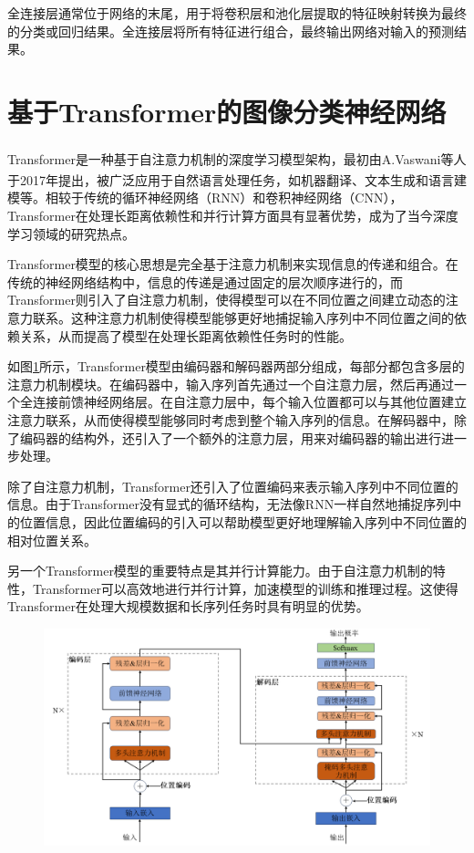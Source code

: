全连接层通常位于网络的末尾，用于将卷积层和池化层提取的特征映射转换为最终的分类或回归结果。全连接层将所有特征进行组合，最终输出网络对输入的预测结果。


\section{基于Transformer的图像分类神经网络}
Transformer\textsuperscript{\cite{bengio2013representation}}是一种基于自注意力机制的深度学习模型架构，最初由A.Vaswani等人于2017年提出\textsuperscript{\cite{vaswani2017attenion}}，被广泛应用于自然语言处理任务，如机器翻译、文本生成和语言建模等。相较于传统的循环神经网络（RNN）和卷积神经网络（CNN），Transformer在处理长距离依赖性和并行计算方面具有显著优势，成为了当今深度学习领域的研究热点。

Transformer模型的核心思想是完全基于注意力机制来实现信息的传递和组合。在传统的神经网络结构中，信息的传递是通过固定的层次顺序进行的，而Transformer则引入了自注意力机制，使得模型可以在不同位置之间建立动态的注意力联系。这种注意力机制使得模型能够更好地捕捉输入序列中不同位置之间的依赖关系，从而提高了模型在处理长距离依赖性任务时的性能。

如图\ref{fig:vit1}所示，Transformer模型由编码器和解码器两部分组成，每部分都包含多层的注意力机制模块。在编码器中，输入序列首先通过一个自注意力层，然后再通过一个全连接前馈神经网络层。在自注意力层中，每个输入位置都可以与其他位置建立注意力联系，从而使得模型能够同时考虑到整个输入序列的信息。在解码器中，除了编码器的结构外，还引入了一个额外的注意力层，用来对编码器的输出进行进一步处理。

除了自注意力机制，Transformer还引入了位置编码来表示输入序列中不同位置的信息。由于Transformer没有显式的循环结构，无法像RNN一样自然地捕捉序列中的位置信息，因此位置编码的引入可以帮助模型更好地理解输入序列中不同位置的相对位置关系。

另一个Transformer模型的重要特点是其并行计算能力。由于自注意力机制的特性，Transformer可以高效地进行并行计算，加速模型的训练和推理过程。这使得Transformer在处理大规模数据和长序列任务时具有明显的优势。


\begin{figure}[h]
	\centering 
	\includegraphics[width=15cm]{fig/ch2/vit1.png}
	\label{fig:vit1}
\end{figure}

